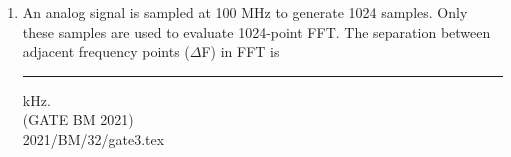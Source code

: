 \begin{enumerate}[label=\thechapter.\arabic*,ref=\thechapter.\theenumi]

\item An analog signal is sampled at 100 MHz to generate 1024 samples. Only
these samples are used to evaluate 1024-point FFT. The separation between
adjacent frequency points ($\Delta$F) in FFT is \rule{1cm}{0.5mm} kHz.\\
\hfill (GATE BM 2021)\\
\solution
 {2021/BM/32/gate3.tex}
\newpage

\end{enumerate}
